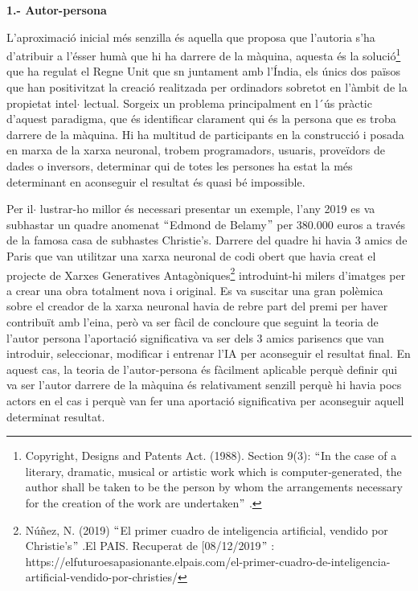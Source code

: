 \documentclass[12pt]{article}
\renewcommand{\_}{\kern-1.5pt\textunderscore\kern-1.5pt}
\begin{document}
\begin{itemize}
\vspace{\baselineskip}
\textbf{1.- Autor-persona}\par

\begin{justify}
L’aproximació inicial més senzilla és aquella que proposa que l’autoria s’ha d’atribuir a l’ésser humà que hi ha darrere de la màquina, aquesta és la solució\footnote{ Copyright, Designs and Patents Act. (1988). Section 9(3): $``$In the case of a literary, dramatic, musical or artistic work which is computer‐generated, the author shall be taken to be the person by whom the arrangements necessary for the creation of the work are undertaken$"$ . } que  ha regulat el Regne Unit que sn juntament amb l’Índia, els únics dos països que han positivitzat la creació realitzada per ordinadors sobretot en l’àmbit de la propietat intel$ \cdot $ lectual. Sorgeix un problema principalment en l´ús pràctic d’aquest paradigma, que és identificar clarament qui és la persona que es troba darrere de la màquina. Hi ha multitud de participants en la construcció i posada en marxa de la xarxa neuronal, trobem programadors, usuaris, proveïdors de dades o inversors, determinar qui de totes les persones ha estat la més determinant en aconseguir el resultat és quasi bé impossible.
\end{justify}\par


\vspace{\baselineskip}
\begin{justify}
Per il$ \cdot $ lustrar-ho millor és necessari presentar un exemple, l’any 2019 es va subhastar un quadre anomenat $``$Edmond de Belamy$"$  per 380.000 euros a través de la famosa casa de subhastes Christie’s. Darrere del quadre hi havia 3 amics de Paris que van utilitzar una xarxa neuronal de codi obert que havia creat el projecte de Xarxes Generatives Antagòniques\footnote{ Núñez, N. (2019) $``$El primer cuadro de inteligencia artificial, vendido por Christie’s$"$ .El PAIS. Recuperat de [08/12/2019$"$ : https://elfuturoesapasionante.elpais.com/el-primer-cuadro-de-inteligencia-artificial-vendido-por-christies/ } introduint-hi milers d’imatges per a crear una obra totalment nova i original. Es va suscitar una gran polèmica sobre  el creador de la xarxa neuronal havia de rebre part del premi per haver contribuït amb l’eina, però va ser fàcil de concloure que seguint la teoria de l’autor persona l’aportació significativa va ser dels 3 amics parisencs que van introduir, seleccionar, modificar i entrenar l’IA per aconseguir el resultat final. En aquest cas, la teoria de l’autor-persona és fàcilment aplicable perquè definir qui va ser  l’autor darrere de la màquina és relativament senzill perquè hi havia pocs actors en el cas i perquè van fer una aportació significativa per aconseguir aquell determinat resultat.  
\end{justify}\par



\end{itemize}
\end{document}
